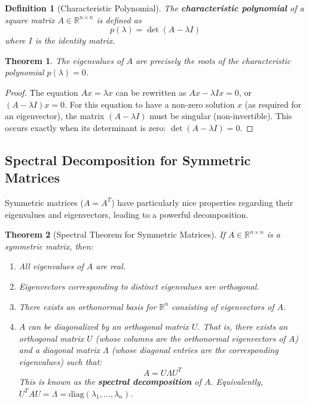 \documentclass[11pt, a4paper]{article}
\theoremstyle{mydefinitionstyle}
\newtheorem{definition}{Definition}[section]
\theoremstyle{mytheoremstyle}
\newtheorem{theorem}{Theorem}[section]
\newcommand{\R}{\mathbb{R}}
\begin{document}
\begin{definition}[Characteristic Polynomial] \label{def:char_poly}
    The \textbf{characteristic polynomial} of a square matrix $A \in \R^{n \times n}$ is defined as
    \[ p(\lambda) = \det(A - \lambda I) \]
    where $I$ is the identity matrix.
\end{definition}

\begin{theorem} \label{thm:eigen_char_poly}
    The eigenvalues of $A$ are precisely the roots of the characteristic polynomial $p(\lambda) = 0$.
\end{theorem}
\begin{proof}
    The equation $Ax = \lambda x$ can be rewritten as $Ax - \lambda Ix = 0$, or $(A - \lambda I)x = 0$. For this equation to have a non-zero solution $x$ (as required for an eigenvector), the matrix $(A - \lambda I)$ must be singular (non-invertible). This occurs exactly when its determinant is zero: $\det(A - \lambda I) = 0$.
\end{proof}

\subsection{Spectral Decomposition for Symmetric Matrices}

Symmetric matrices ($A = A^T$) have particularly nice properties regarding their eigenvalues and eigenvectors, leading to a powerful decomposition.

\begin{theorem}[Spectral Theorem for Symmetric Matrices] \label{thm:spectral}
    If $A \in \R^{n \times n}$ is a symmetric matrix, then:
    \begin{enumerate}
        \item All eigenvalues of $A$ are real.
        \item Eigenvectors corresponding to distinct eigenvalues are orthogonal.
        \item There exists an orthonormal basis for $\R^n$ consisting of eigenvectors of $A$.
        \item $A$ can be diagonalized by an orthogonal matrix $U$. That is, there exists an orthogonal matrix $U$ (whose columns are the orthonormal eigenvectors of $A$) and a diagonal matrix $\Lambda$ (whose diagonal entries are the corresponding eigenvalues) such that:
            \[ A = U \Lambda U^T \]
            This is known as the \textbf{spectral decomposition} of $A$. Equivalently, $U^T A U = \Lambda = \text{diag}(\lambda_1, \dots, \lambda_n)$.
    \end{enumerate}
\end{theorem}
\end{document}

